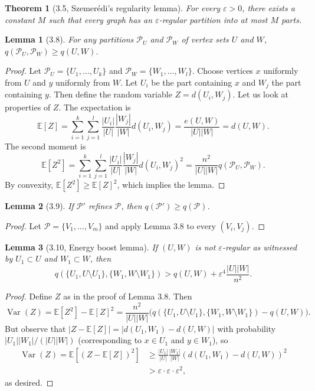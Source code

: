 \documentclass[UTF8,11pt]{ctexart}
\newtheorem*{theorem}{Theorem}
\newtheorem*{lemma}{Lemma}
\theoremstyle{definition}
\newcommand{\E}{\mathbb E}
\DeclareMathOperator{\Var}{Var}
\begin{document}
\begin{theorem}[3.5, Szemer\'edi's regularity lemma]
For every $\varepsilon>0$, there exists a constant $M$ such that every graph has an $\varepsilon$-regular partition into at most $M$ parts.
\end{theorem}
\begin{lemma}[3.8]
For any partitions $\mathcal P_U$ and $\mathcal P_W$ of vertex sets $U$ and $W$, $q(\mathcal P_U,\mathcal P_W)\geq q(U,W)$.
\end{lemma}
\begin{proof}
Let $\mathcal P_U=\{U_1,\ldots,U_k\}$ and $\mathcal P_W=\{W_1,\ldots,W_l\}$. Choose vertices $x$ uniformly from $U$ and $y$ uniformly from $W$. Let $U_i$ be the part containing $x$ and $W_j$ the part containing $y$. Then define the random variable $Z=d(U_i,W_j)$. Let us look at properties of $Z$. The expectation is
\[\E[Z]=\sum_{i=1}^k\sum_{j=1}^l\frac{|U_i|}{|U|}\frac{|W_j|}{|W|}d(U_i,W_j)=\frac{e(U,W)}{|U||W|}=d(U,W).\]
The second moment is
\[\E[Z^2]=\sum_{i=1}^k\sum_{j=1}^l\frac{|U_i|}{|U|}\frac{|W_j|}{|W|}d(U_i,W_j)^2=\frac{n^2}{|U||W|}q(\mathcal P_U,\mathcal P_W).\]
By convexity, $\E[Z^2]\geq\E[Z]^2$, which implies the lemma.
\end{proof}
\begin{lemma}[3.9]
If $\mathcal P'$ refines $\mathcal P$, then $q(\mathcal P')\geq q(\mathcal P)$.
\end{lemma}
\begin{proof}
Let $\mathcal P=\{V_1,\ldots,V_m\}$ and apply Lemma 3.8 to every $(V_i,V_j)$.
\end{proof}
\begin{lemma}[3.10, Energy boost lemma]
If $(U,W)$ is not $\varepsilon$-regular as witnessed by $U_1\subset U$ and $W_1\subset W$, then
\[q(\{U_1,U\setminus U_1\},\{W_1,W\setminus W_1\})>q(U,W)+\varepsilon^4\frac{|U||W|}{n^2}.\]
\end{lemma}
\begin{proof}
Define $Z$ as in the proof of Lemma 3.8. Then
\[\Var(Z)=\E[Z^2]-\E[Z]^2=\frac{n^2}{|U||W|}\big(q(\{U_1,U\setminus U_1\},\{W_1,W\setminus W_1\})-q(U,W)\big).\]
But observe that $|Z-\E[Z]|=|d(U_1,W_1)-d(U,W)|$ with probability $|U_1||W_1|/(|U||W|)$ (corresponding to $x\in U_1$ and $y\in W_1$), so
\[\begin{split}
\Var(Z)=\E[(Z-\E[Z])^2]&\geq\frac{|U_1|}{|U|}\frac{|W_1|}{|W|}(d(U_1,W_1)-d(U,W))^2\\
&>\varepsilon\cdot\varepsilon\cdot\varepsilon^2,
\end{split}\]
as desired.
\end{proof}
\end{document}
